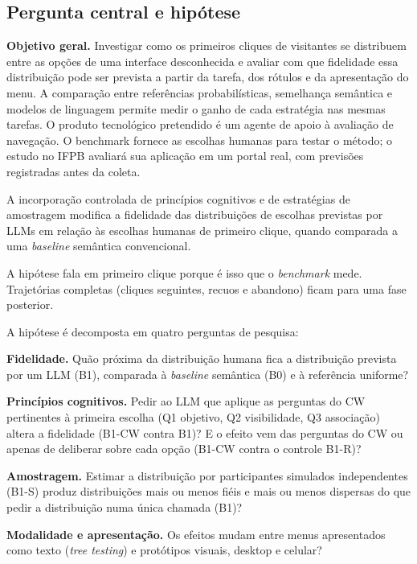 \documentclass[12pt]{article}
\begin{document}
\subsection{Pergunta central e hipótese}

\textbf{Objetivo geral.} Investigar como os primeiros cliques de visitantes se distribuem entre as opções de uma interface desconhecida e avaliar com que fidelidade essa distribuição pode ser prevista a partir da tarefa, dos rótulos e da apresentação do menu. A comparação entre referências probabilísticas, semelhança semântica e modelos de linguagem permite medir o ganho de cada estratégia nas mesmas tarefas. O produto tecnológico pretendido é um agente de apoio à avaliação de navegação. O benchmark fornece as escolhas humanas para testar o método; o estudo no IFPB avaliará sua aplicação em um portal real, com previsões registradas antes da coleta.

\begin{nota}
A incorporação controlada de princípios cognitivos e de estratégias de amostragem modifica a fidelidade das distribuições de escolhas previstas por LLMs em relação às escolhas humanas de primeiro clique, quando comparada a uma \textit{baseline} semântica convencional.
\end{nota}

A hipótese fala em primeiro clique porque é isso que o \textit{benchmark} mede. Trajetórias completas (cliques seguintes, recuos e abandono) ficam para uma fase posterior.

A hipótese é decomposta em quatro perguntas de pesquisa:
\begin{description}[leftmargin=1.2cm,style=nextline]
\item[QP1] \textbf{Fidelidade.} Quão próxima da distribuição humana fica a distribuição prevista por um LLM (B1), comparada à \textit{baseline} semântica (B0) e à referência uniforme?
\item[QP2] \textbf{Princípios cognitivos.} Pedir ao LLM que aplique as perguntas do CW pertinentes à primeira escolha (Q1 objetivo, Q2 visibilidade, Q3 associação) altera a fidelidade (B1-CW contra B1)? E o efeito vem das perguntas do CW ou apenas de deliberar sobre cada opção (B1-CW contra o controle B1-R)?
\item[QP3] \textbf{Amostragem.} Estimar a distribuição por participantes simulados independentes (B1-S) produz distribuições mais ou menos fiéis e mais ou menos dispersas do que pedir a distribuição numa única chamada (B1)?
\item[QP4] \textbf{Modalidade e apresentação.} Os efeitos mudam entre menus apresentados como texto (\textit{tree testing}) e protótipos visuais, desktop e celular?
\end{description}
\end{document}
